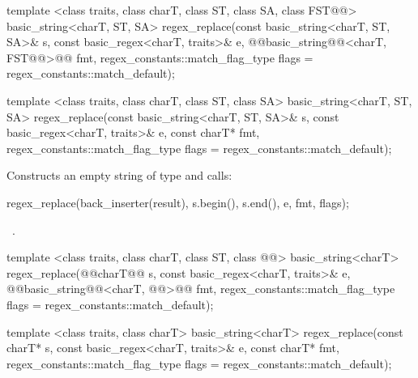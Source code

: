 \documentclass[ebook,11pt,article]{memoir}
\begin{document}
\begin{itemdecl}
template <class traits, class charT, class ST, class SA, class FST@@>
  basic_string<charT, ST, SA>
  regex_replace(const basic_string<charT, ST, SA>& s,
                const basic_regex<charT, traits>& e,
                @@basic_string@@<charT, FST@@>@\removed{\&}@ fmt,
                regex_constants::match_flag_type flags =
                  regex_constants::match_default); 
\end{itemdecl}
\begin{removedblock}
\begin{itemdecl}                  
template <class traits, class charT, class ST, class SA>
  basic_string<charT, ST, SA>
  regex_replace(const basic_string<charT, ST, SA>& s,
                const basic_regex<charT, traits>& e,
                const charT* fmt,
                regex_constants::match_flag_type flags =
                  regex_constants::match_default);
\end{itemdecl}
\end{removedblock}
\begin{itemdescr}
\pnum\effects  Constructs an empty string  of
type  and calls: 
\begin{codeblock}
regex_replace(back_inserter(result), s.begin(), s.end(), e, fmt, flags);
\end{codeblock}

\pnum
\returns\ .
\end{itemdescr}
\begin{itemdecl}
template <class traits, class charT, class ST, class @@>
  basic_string<charT>
  regex_replace(@@charT@\removed{*}@ s,
                const basic_regex<charT, traits>& e,
                @@basic_string@@<charT, @@>@\removed{\&}@ fmt,
                regex_constants::match_flag_type flags =
                  regex_constants::match_default);
\end{itemdecl}
\begin{removedblock}
\begin{itemdecl}
template <class traits, class charT>
  basic_string<charT>
  regex_replace(const charT* s,
                const basic_regex<charT, traits>& e,
                const charT* fmt,
                regex_constants::match_flag_type flags =
                  regex_constants::match_default);
\end{itemdecl}
\end{removedblock}
\end{document}
